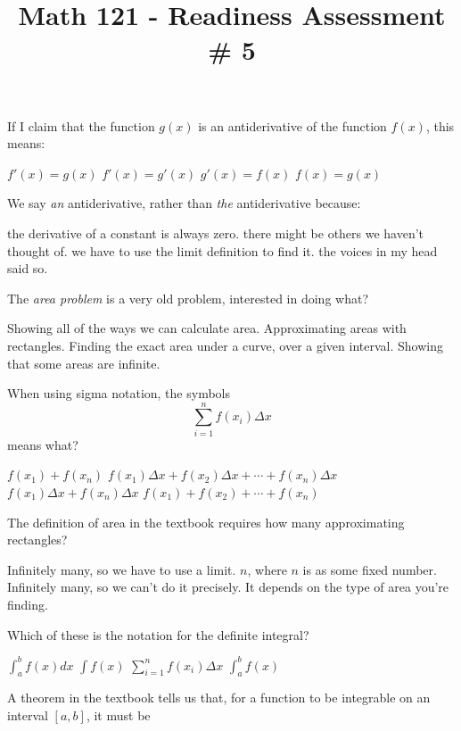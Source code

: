 \documentclass{exam}
\title{Math 121 - Readiness Assessment \# 5}
\date{}
\begin{document}
\maketitle

\begin{questions}
\question
If I claim that the function $g(x)$ is an antiderivative of the function $f(x)$, this means:
\begin{choices}
\choice $f'(x) = g(x)$
\choice $f'(x) = g'(x)$
\choice $g'(x) = f(x)$
\choice $f(x) = g(x)$
\end{choices}
\question
We say \textit{an} antiderivative, rather than \textit{the} antiderivative because:
\begin{choices}
\choice the derivative of a constant is always zero.
\choice there might be others we haven't thought of.
\choice we have to use the limit definition to find it.
\choice the voices in my head said so.
\end{choices}
\question
The \textit{area problem} is a very old problem, interested in doing what?
\begin{choices}
\choice Showing all of the ways we can calculate area.
\choice Approximating areas with rectangles.
\choice Finding the exact area under a curve, over a given interval.
\choice Showing that some areas are infinite.
\end{choices}
\question
When using sigma notation, the symbols $$\sum_{i=1}^n f(x_i) \Delta x$$ means what?
\begin{choices}
\choice $f(x_1) + f(x_n)$
\choice $f(x_1)\Delta x + f(x_2)\Delta x + \cdots + f(x_n)\Delta x$
\choice $f(x_1)\Delta x + f(x_n)\Delta x $
\choice $f(x_1)+ f(x_2) + \cdots + f(x_n)$
\end{choices}
\question
The definition of area in the textbook requires how many approximating rectangles?\begin{choices}
\choice Infinitely many, so we have to use a limit.
\choice $n$, where $n$ is as some fixed number.
\choice Infinitely many, so we can't do it precisely.
\choice It depends on the type of area you're finding.
\end{choices}
\newpage
\question
Which of these is the notation for the definite integral?
\begin{choices}
\choice $\int_a^b f(x) dx$
\choice $\int f(x)$
\choice $\sum_{i=1}^n f(x_i) \Delta x$
\choice $\int_a^b f(x)$
\end{choices}
\question
A theorem in the textbook tells us that, for a function to be integrable on an interval $[a,b]$, it must be

\end{questions}
\end{document}
